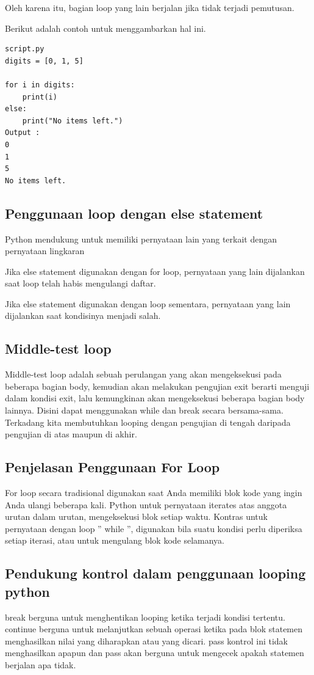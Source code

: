 Oleh karena itu, bagian loop yang lain berjalan jika tidak terjadi pemutusan.

Berikut adalah contoh untuk menggambarkan hal ini.
\begin{verbatim}
script.py 
digits = [0, 1, 5]

for i in digits:
    print(i)
else:
    print("No items left.")
Output :
0
1
5
No items left.
\end{verbatim}

\subsection{Penggunaan loop dengan else statement}
Python mendukung untuk memiliki pernyataan lain yang terkait dengan pernyataan lingkaran

Jika else statement digunakan dengan for loop, pernyataan yang lain dijalankan saat loop telah habis mengulangi daftar.

Jika else statement digunakan dengan loop sementara, pernyataan yang lain dijalankan saat kondisinya menjadi salah.

\subsection{Middle-test loop}
Middle-test loop adalah sebuah perulangan yang akan mengeksekusi pada beberapa bagian body, kemudian akan melakukan pengujian exit berarti menguji dalam kondisi exit, lalu kemungkinan akan mengeksekusi beberapa bagian body lainnya. Disini dapat menggunakan while dan break secara bersama-sama. Terkadang kita membutuhkan looping dengan pengujian di tengah daripada pengujian di atas maupun di akhir.

\subsection{Penjelasan Penggunaan For Loop}
For loop secara tradisional digunakan saat Anda memiliki blok kode yang ingin Anda ulangi beberapa kali. Python untuk pernyataan iterates atas anggota urutan dalam urutan, mengeksekusi blok setiap waktu. Kontras untuk pernyataan dengan loop '' while '', digunakan bila suatu kondisi perlu diperiksa setiap iterasi, atau untuk mengulang blok kode selamanya.

\subsection{Pendukung kontrol dalam penggunaan looping python}
break berguna untuk menghentikan looping ketika terjadi kondisi tertentu.
continue berguna untuk melanjutkan sebuah operasi ketika pada blok statemen menghasilkan nilai yang diharapkan atau yang dicari.
pass kontrol ini tidak menghasilkan apapun dan pass akan berguna untuk mengecek apakah statemen berjalan apa tidak.
